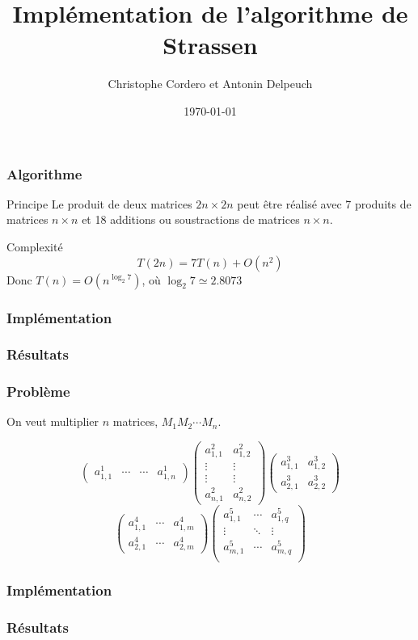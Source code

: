 \documentclass{beamer}
\begin{document}
\title{Implémentation de l'algorithme de Strassen}
\author{Christophe Cordero et Antonin Delpeuch}
\date{\today}

\frame{\titlepage}

\begin{frame}
\frametitle{Algorithme}
\begin{block}{Principe}
Le produit de deux matrices $2n \times 2n$ peut être réalisé avec 7
produits de matrices $n \times n$ et 18 additions ou soustractions de
matrices $n \times n$.
\end{block}

\begin{block}{Complexité}
$$T(2n) = 7 T(n) + O(n^2)$$
Donc $T(n) = O(n^{\log_2 7})$, où $\log_2 7 \simeq 2.8073$
\end{block}

\end{frame}

\begin{frame}
\frametitle{Implémentation}

\end{frame}

\begin{frame}
\frametitle{Résultats}

\end{frame}

\begin{frame}
\frametitle{Problème}
On veut multiplier $n$ matrices, $M_1 M_2 \cdots M_n$.

$$
\begin{pmatrix}
a^1_{1,1} & \cdots &\cdots & a^1_{1,n}
\end{pmatrix}
\begin{pmatrix}
a^2_{1,1} & a^2_{1,2} \\
\vdots    & \vdots    \\
\vdots    & \vdots    \\
a^2_{n,1} & a^2_{n,2} 
\end{pmatrix}
\begin{pmatrix}
a^3_{1,1} & a^3_{1,2} \\
a^3_{2,1} & a^3_{2,2}
\end{pmatrix}
$$
$$
\begin{pmatrix}
a^4_{1,1} & \cdots & a^4_{1,m} \\
a^4_{2,1} & \cdots & a^4_{2,m}
\end{pmatrix}
\begin{pmatrix}
a^5_{1,1} & \cdots & a^5_{1,q} \\
\vdots    & \ddots & \vdots    \\
a^5_{m,1} & \cdots & a^5_{m,q} \\
\end{pmatrix}
$$

\end{frame}

\begin{frame}
\frametitle{Implémentation}

\end{frame}

\begin{frame}
\frametitle{Résultats}


\end{frame}
\end{document}

